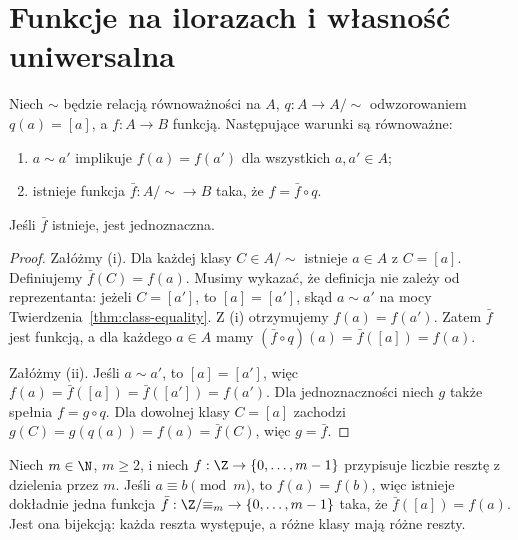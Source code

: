 \section{Funkcje na ilorazach i własność uniwersalna}
\begin{twierdzenie}\label{thm:quotient-universal}
Niech $\sim$ będzie relacją równoważności na $A$, $q:A\to A/{\sim}$ odwzorowaniem $q(a)=[a]$, a $f:A\to B$ funkcją. Następujące warunki są równoważne:
\begin{enumerate}[label=(\roman*)]
\item $a\sim a'$ implikuje $f(a)=f(a')$ dla wszystkich $a,a'\in A$;
\item istnieje funkcja $\bar f:A/{\sim}\to B$ taka, że $f=\bar f\circ q$.
\end{enumerate}
Jeśli $\bar f$ istnieje, jest jednoznaczna.
\end{twierdzenie}
\begin{proof}
Załóżmy (i). Dla każdej klasy $C\in A/{\sim}$ istnieje $a\in A$ z $C=[a]$. Definiujemy $\bar f(C)=f(a)$. Musimy wykazać, że definicja nie zależy od reprezentanta: jeżeli $C=[a']$, to $[a]=[a']$, skąd $a\sim a'$ na mocy Twierdzenia~\ref{thm:class-equality}. Z (i) otrzymujemy $f(a)=f(a')$. Zatem $\bar f$ jest funkcją, a dla każdego $a\in A$ mamy $(\bar f\circ q)(a)=\bar f([a])=f(a)$.

Załóżmy (ii). Jeśli $a\sim a'$, to $[a]=[a']$, więc $f(a)=\bar f([a])=\bar f([a'])=f(a')$. Dla jednoznaczności niech $g$ także spełnia $f=g\circ q$. Dla dowolnej klasy $C=[a]$ zachodzi $g(C)=g(q(a))=f(a)=\bar f(C)$, więc $g=\bar f$.
\end{proof}
\begin{przyklad}
Niech $m\in\N$, $m\ge2$, i niech $f:\Z\to\{0,\ldots,m-1\}$ przypisuje liczbie resztę z dzielenia przez $m$. Jeśli $a\equiv b\pmod m$, to $f(a)=f(b)$, więc istnieje dokładnie jedna funkcja $\bar f:\Z/{\equiv_m}\to\{0,\ldots,m-1\}$ taka, że $\bar f([a])=f(a)$. Jest ona bijekcją: każda reszta występuje, a różne klasy mają różne reszty.
\end{przyklad}

